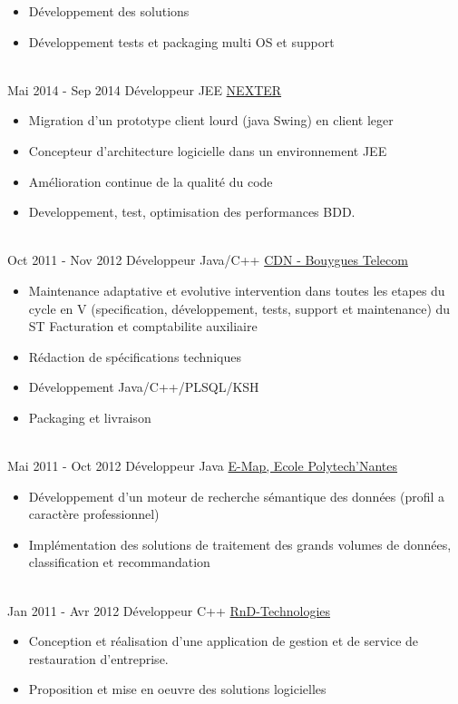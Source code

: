 \documentclass[letterpaper]{twentysecondcv} %
\begin{document}
\begin{twenty}
{\begin{itemize}
        \item Développement des solutions
        \item Développement tests et packaging multi OS et support
    	\end{itemize}
    	}
	\\   
		\twentyitem
		{Mai 2014 -}
		{Sep 2014}
		{Développeur JEE}
		{\href{https://www.nexter-group.fr/}{NEXTER}}
		{}
		{
		\begin{itemize}
		\item Migration d'un prototype client lourd (java Swing) en client leger
		\item Concepteur d'architecture logicielle dans un environnement JEE
		\item Amélioration continue de la qualité du code
		\item Developpement, test, optimisation des performances BDD.
		\end{itemize}
		}       
       \\
	    \twentyitem
	    {Oct 2011 -}
	    {Nov 2012}
	    {Développeur Java/C++}
	    {\href{https://www.jobs.bouyguestelecom.fr/}{CDN - Bouygues Telecom}}
	    {}
	    {
	    \begin{itemize}
	    \item Maintenance adaptative et evolutive intervention dans toutes les etapes du cycle en V (specification, développement, tests, support et maintenance) du ST Facturation et comptabilite auxiliaire
	    \item Rédaction de spécifications techniques
	    \item Développement Java/C++/PLSQL/KSH
	    \item Packaging et livraison	
	    \end{itemize}
	    }
    
	   \\
	    \twentyitem
	    {Mai 2011 -}
	    {Oct 2012}
	    {Développeur Java}
	    {\href{}{E-Map, Ecole Polytech'Nantes}}
	    {}
	    {
	    \begin{itemize}
	    \item Développement d'un moteur de recherche sémantique des données (profil a caractère professionnel)
	    \item Implémentation des solutions de traitement des grands volumes de données, classification et recommandation	
	    \end{itemize}
	    }

	   \\
	    \twentyitem
	    {Jan 2011 -}
	    {Avr 2012}
	    {Développeur C++}
	    {\href{}{RnD-Technologies}}
	    {}
	    {
	    \begin{itemize}
		\item Conception et réalisation d'une application de gestion et de service de restauration d'entreprise.
		\item Proposition et mise en oeuvre des solutions logicielles	
	    \end{itemize}
	    }


\end{twenty}
\end{document}
